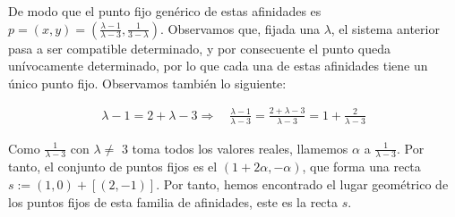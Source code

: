 De modo que el punto fijo genérico de estas afinidades es $p = (x,y) = (\frac{\lambda - 1}{\lambda - 3}, \frac{1}{3 - \lambda})$. Observamos que, fijada una $\lambda$, el sistema anterior pasa a ser compatible determinado, y por consecuente el punto queda unívocamente determinado, por lo que cada una de estas afinidades tiene un único punto fijo. Observamos también lo siguiente:

\begin{gather*}
    \lambda - 1 = 2 + \lambda - 3 \Longrightarrow \quad \frac{\lambda - 1}{\lambda - 3}= \frac{2+\lambda-3}{\lambda-3} = 1 + \frac{2}{\lambda - 3}
\end{gather*}

Como $\frac{1}{\lambda - 3}$ con $\lambda \neq$ 3 toma todos los valores reales, llamemos $\alpha$ a $\frac{1}{\lambda - 3}$. Por tanto, el conjunto de puntos fijos es el $(1 + 2\alpha, -\alpha)$, que forma una recta $s := (1,0)+ [(2,-1)]$. Por tanto, hemos encontrado el lugar geométrico de los puntos fijos de  esta familia de afinidades, este es la recta $s$.